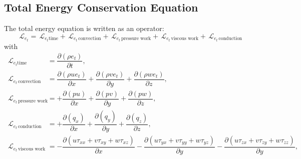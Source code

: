 \documentclass[10pt]{article}
\newcommand{\Diff}[2] {\dfrac{\partial( #1)}{\partial #2}}
\newcommand{\Lo}{\,\mathcal{L}}
\newcommand{\convection}{\,\text{convection}}
\newcommand{\conduction}{\,\text{conduction}}
\newcommand{\workpressure}{\,\text{pressure work}}
\newcommand{\workviscous}{\,\text{viscous work}}
\begin{document}
\subsection{Total Energy Conservation Equation}
The total energy equation is written as an operator:
\begin{equation*}
 \label{eq:ns1d_14}
\Lo_{e_t} = \Lo_{e_t \text{time}} + \Lo_{e_t \convection} + \Lo_{e_t \workpressure}+ \Lo_{e_t \workviscous} + \Lo_{e_t \conduction} 
\end{equation*}
with
\begin{equation*}
\begin{split}
\Lo_{e_t \text{time}}&= \Diff{\rho e_t}{t} ,\\
\Lo_{e_t \convection} &= \Diff{\rho u e_t}{x}+\Diff{\rho v e_t}{y}+\Diff{\rho we_t}{z},\\
\Lo_{e_t \workpressure} &=+\Diff{pu}{x}+\Diff{pv}{y}+\Diff{pw}{z} ,\\
\Lo_{e_t \conduction} &=+\Diff{q_x}{x} +\Diff{q_y}{y} +\Diff{q_z}{z},\\ 
\Lo_{e_t \workviscous} &= -\Diff{u\tau_{xx}+v\tau_{xy}+w\tau_{xz}}{x}-\Diff{u\tau_{yx}+v\tau_{yy}+w\tau_{yz}}{y}-\Diff{u\tau_{zx}+v\tau_{zy}+w\tau_{zz}}{y},\\
 \end{split}
\end{equation*}
\end{document}
